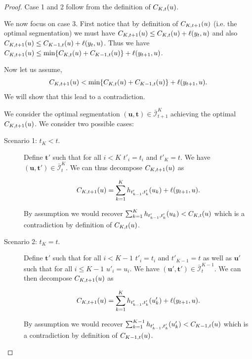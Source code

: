 \documentclass{article}
\begin{document}
\begin{proof}
Case 1 and 2 follow from the definition of $C_{K,t}(u)$.

We now focus on case 3.
First notice that by definition of $C_{K,t+1}(u)$ (i.e. the optimal segmentation) we must have
$C_{K,t+1}(u) \leq C_{K,t}(u) + \ell(y_t,u)$ and also
$C_{K,t+1}(u) \leq C_{K-1,t}(u) + \ell(y_t,u)$. Thus we have
$C_{K,t+1}(u) \leq \min \{ C_{K,t}(u) + C_{K-1,t}(u) \} + \ell(y_{t+1},u)$.

Now let us assume,
$$C_{K,t+1}(u) < \min \{ C_{K,t}(u) + C_{K-1,t}(u) \} + \ell(y_{t+1},u).$$
We will show that this lead to a contradiction.

We consider the optimal segmentation $(\mathbf u, \mathbf t)\in\bar{\mathcal I}_{t+1}^K$ achieving the optimal $C_{K,t+1}(u)$.
We consider two possible cases:
\begin{description}
\item[Scenario 1: $t_K < t$.]
Define $\mathbf t'$ such that for all $i < K$ $t'_i = t_i$ and $t'_K = t$.
We have $(\mathbf u, \mathbf t')\in\bar{\mathcal I}_{t}^K$.
We can thus decompose $C_{K,t+1}(u)$ as

$$C_{K,t+1}(u) = \sum_{k=1}^K
  h_{t'_{k-1}, t'_k}(u_k) + \ell(y_{t+1},u).$$ 

By assumption we would recover $\sum_{k=1}^K h_{t'_{k-1}, t'_k}(u_k) < C_{K,t}(u)$ which is a contradiction
by definition of $C_{K,t}(u)$. 

\item[Scenario 2: $t_K=t$.]
Define $\mathbf t'$ such that for all $i < K-1$ $t'_i = t_i$ and $t'_{K-1} = t$ as well as
$\mathbf u'$ such that for all $i \leq K-1$ $u'_i = u_i$.
We have $(\mathbf u', \mathbf t')\in\bar{\mathcal I}_{t}^{K-1}$.
We can then decompose $C_{K,t+1}(u)$ as

$$C_{K,t+1}(u) = \sum_{k=1}^K
  h_{t'_{k-1}, t'_k}(u'_k) + \ell(y_{t+1},u).$$ 

By assumption we would recover $\sum_{k=1}^{K-1} h_{t'_{k-1}, t'_k}(u'_k) < C_{K-1,t}(u)$ which is a contradiction
by definition of $C_{K-1,t}(u)$. 
\end{description}
\end{proof}
\end{document}
